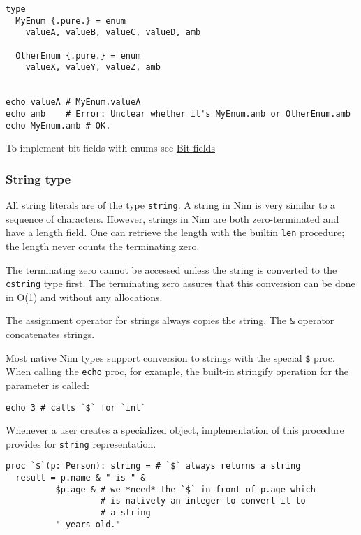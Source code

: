 \begin{verbatim}
type
  MyEnum {.pure.} = enum
    valueA, valueB, valueC, valueD, amb

  OtherEnum {.pure.} = enum
    valueX, valueY, valueZ, amb


echo valueA # MyEnum.valueA
echo amb    # Error: Unclear whether it's MyEnum.amb or OtherEnum.amb
echo MyEnum.amb # OK.
\end{verbatim}

To implement bit fields with enums see
\protect\hyperlink{set-type-bit-fields}{Bit fields}

\hypertarget{string-type}{%
\subsubsection{String type}\label{string-type}}

All string literals are of the type \texttt{string}. A string in Nim is
very similar to a sequence of characters. However, strings in Nim are
both zero-terminated and have a length field. One can retrieve the
length with the builtin \texttt{len} procedure; the length never counts
the terminating zero.

The terminating zero cannot be accessed unless the string is converted
to the \texttt{cstring} type first. The terminating zero assures that
this conversion can be done in O(1) and without any allocations.

The assignment operator for strings always copies the string. The
\texttt{\&} operator concatenates strings.

Most native Nim types support conversion to strings with the special
\texttt{\$} proc. When calling the \texttt{echo} proc, for example, the
built-in stringify operation for the parameter is called:

\begin{verbatim}
echo 3 # calls `$` for `int`
\end{verbatim}

Whenever a user creates a specialized object, implementation of this
procedure provides for \texttt{string} representation.

\begin{verbatim}
proc `$`(p: Person): string = # `$` always returns a string
  result = p.name & " is " &
          $p.age & # we *need* the `$` in front of p.age which
                   # is natively an integer to convert it to
                   # a string
          " years old."
\end{verbatim}

